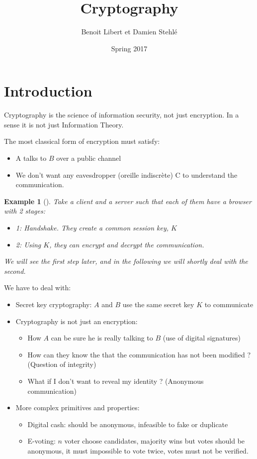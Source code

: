 \documentclass{article}
\title{Cryptography}
\author{Benoit Libert et Damien Stehlé	}
\date{Spring 2017}
\newtheorem{ex}[thm]{Example}
\newcommand{\Ex}[3]{\begin{ex}[#1]\label{#2}#3\end{ex}}
\begin{document}
\maketitle

\tableofcontents

\newpage

\section{Introduction}
Cryptography is the science of information security, not just encryption. In a sense it is not just Information Theory.

The most classical form of encryption must satisfy:
\begin{itemize}
\item A talks to $B$ over a public channel
\item We don't want any eavesdropper (oreille indiscrète) C to understand the communication.
\end{itemize}

\Ex{}{}{Take a client and a server such that each of them have a browser with 2 stages:
\begin{itemize}
\item 1: Handshake. They create a common session key, $K$
\item 2: Using $K$, they can encrypt and decrypt the communication.
\end{itemize}

We will see the first step later, and in the following we will shortly deal with the second.
}

We have to deal with:
\begin{itemize}
\item Secret key cryptography: $A$ and $B$ use the same secret key $K$ to communicate
\item Cryptography is not just an encryption:
\begin{itemize}
\item How $A$ can be sure he is really talking to $B$ (use of digital signatures)
\item How can they know the that the communication has not been modified ? (Question of integrity)
\item What if I don't want to reveal my identity ? (Anonymous communication)
\end{itemize} 
\item More complex primitives and properties:
\begin{itemize}
\item Digital cash: should be anonymous, infeasible to fake or duplicate
\item E-voting: $n$ voter choose candidates, majority wins but votes should be anonymous, it must impossible to vote twice, votes must not be verified.
\end{itemize}
\end{itemize}
\end{document}
